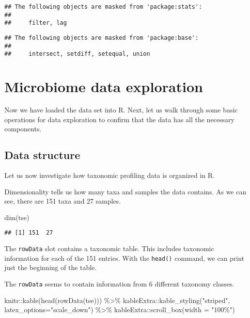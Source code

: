 \documentclass[
  oneside]{book}
\newenvironment{Shaded}{\begin{snugshade}}{\end{snugshade}}
\newcommand{\AttributeTok}[1]{\textcolor[rgb]{0.77,0.63,0.00}{#1}}
\newcommand{\FunctionTok}[1]{\textcolor[rgb]{0.00,0.00,0.00}{#1}}
\newcommand{\NormalTok}[1]{#1}
\newcommand{\SpecialCharTok}[1]{\textcolor[rgb]{0.00,0.00,0.00}{#1}}
\newcommand{\StringTok}[1]{\textcolor[rgb]{0.31,0.60,0.02}{#1}}
\begin{document}
\begin{verbatim}
## The following objects are masked from 'package:stats':
## 
##     filter, lag
\end{verbatim}

\begin{verbatim}
## The following objects are masked from 'package:base':
## 
##     intersect, setdiff, setequal, union
\end{verbatim}

\hypertarget{microbiome-data-exploration}{%
\chapter{Microbiome data exploration}\label{microbiome-data-exploration}}

Now we have loaded the data set into R. Next, let us walk through some
basic operations for data exploration to confirm that the data has all
the necessary components.

\hypertarget{data-structure}{%
\section{Data structure}\label{data-structure}}

Let us now investigate how taxonomic profiling data is organized in R.

Dimensionality tells us how many taxa and samples the data
contains. As we can see, there are 151 taxa and 27
samples.

\begin{Shaded}
\begin{Highlighting}[]
\FunctionTok{dim}\NormalTok{(tse)}
\end{Highlighting}
\end{Shaded}

\begin{verbatim}
## [1] 151  27
\end{verbatim}

The \texttt{rowData} slot contains a taxonomic table. This includes taxonomic
information for each of the 151 entries. With the \texttt{head()}
command, we can print just the beginning of the table.

The \texttt{rowData} seems to contain information from 6
different taxonomy classes.

\begin{Shaded}
\begin{Highlighting}[]
\NormalTok{knitr}\SpecialCharTok{::}\FunctionTok{kable}\NormalTok{(}\FunctionTok{head}\NormalTok{(}\FunctionTok{rowData}\NormalTok{(tse))) }\SpecialCharTok{\%\textgreater{}\%} 
\NormalTok{  kableExtra}\SpecialCharTok{::}\FunctionTok{kable\_styling}\NormalTok{(}\StringTok{"striped"}\NormalTok{, }
                            \AttributeTok{latex\_options=}\StringTok{"scale\_down"}\NormalTok{) }\SpecialCharTok{\%\textgreater{}\%} 
\NormalTok{  kableExtra}\SpecialCharTok{::}\FunctionTok{scroll\_box}\NormalTok{(}\AttributeTok{width =} \StringTok{"100\%"}\NormalTok{)}
\end{Highlighting}
\end{Shaded}
\end{document}
